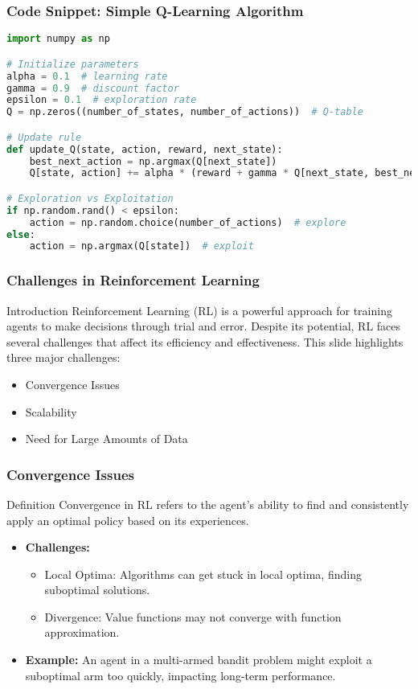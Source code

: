 \documentclass[aspectratio=169]{beamer}
\begin{document}
\begin{frame}[fragile]
    \frametitle{Code Snippet: Simple Q-Learning Algorithm}
    \begin{lstlisting}[language=Python]
import numpy as np

# Initialize parameters
alpha = 0.1  # learning rate
gamma = 0.9  # discount factor
epsilon = 0.1  # exploration rate
Q = np.zeros((number_of_states, number_of_actions))  # Q-table

# Update rule
def update_Q(state, action, reward, next_state):
    best_next_action = np.argmax(Q[next_state])
    Q[state, action] += alpha * (reward + gamma * Q[next_state, best_next_action] - Q[state, action])

# Exploration vs Exploitation
if np.random.rand() < epsilon:
    action = np.random.choice(number_of_actions)  # explore
else:
    action = np.argmax(Q[state])  # exploit
    \end{lstlisting}
\end{frame}

\begin{frame}[fragile]
    \frametitle{Challenges in Reinforcement Learning}
    \begin{block}{Introduction}
        Reinforcement Learning (RL) is a powerful approach for training agents to make decisions through trial and error. Despite its potential, RL faces several challenges that affect its efficiency and effectiveness. This slide highlights three major challenges: 
        \begin{itemize}
            \item Convergence Issues
            \item Scalability
            \item Need for Large Amounts of Data
        \end{itemize}
    \end{block}
\end{frame}

\begin{frame}[fragile]
    \frametitle{Convergence Issues}
    \begin{block}{Definition}
        Convergence in RL refers to the agent's ability to find and consistently apply an optimal policy based on its experiences.
    \end{block}
    \begin{itemize}
        \item \textbf{Challenges:}
        \begin{itemize}
            \item Local Optima: Algorithms can get stuck in local optima, finding suboptimal solutions.
            \item Divergence: Value functions may not converge with function approximation.
        \end{itemize}
        \item \textbf{Example:} An agent in a multi-armed bandit problem might exploit a suboptimal arm too quickly, impacting long-term performance.
    \end{itemize}
\end{frame}
\end{document}
